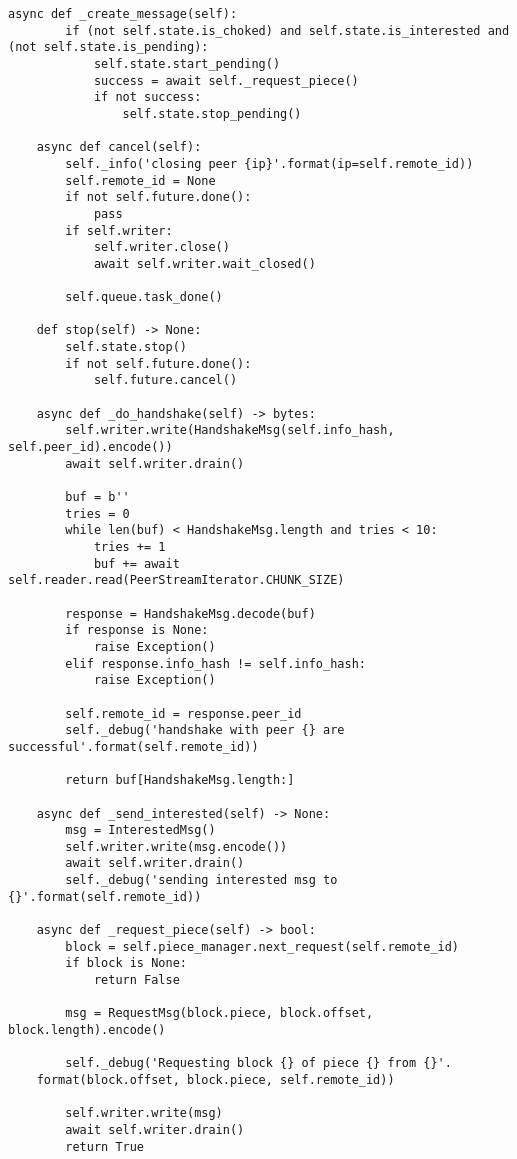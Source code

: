 \begin{lstlisting}[caption = {Класс TorrentClient}]
	async def _create_message(self):
		if (not self.state.is_choked) and self.state.is_interested and (not self.state.is_pending):
			self.state.start_pending()
			success = await self._request_piece()
			if not success:
				self.state.stop_pending()
	
	async def cancel(self):
		self._info('closing peer {ip}'.format(ip=self.remote_id))
		self.remote_id = None
		if not self.future.done():
			pass 
		if self.writer:
			self.writer.close()
			await self.writer.wait_closed()
		
		self.queue.task_done()
	
	def stop(self) -> None:
		self.state.stop()
		if not self.future.done():
			self.future.cancel()
	
	async def _do_handshake(self) -> bytes:
		self.writer.write(HandshakeMsg(self.info_hash, self.peer_id).encode())
		await self.writer.drain()
		
		buf = b''
		tries = 0
		while len(buf) < HandshakeMsg.length and tries < 10:
			tries += 1
			buf += await self.reader.read(PeerStreamIterator.CHUNK_SIZE)
		
		response = HandshakeMsg.decode(buf)
		if response is None:
			raise Exception()
		elif response.info_hash != self.info_hash:
			raise Exception()
		
		self.remote_id = response.peer_id
		self._debug('handshake with peer {} are successful'.format(self.remote_id))
		
		return buf[HandshakeMsg.length:]
	
	async def _send_interested(self) -> None:
		msg = InterestedMsg()
		self.writer.write(msg.encode())
		await self.writer.drain()
		self._debug('sending interested msg to {}'.format(self.remote_id))
	
	async def _request_piece(self) -> bool:
		block = self.piece_manager.next_request(self.remote_id)
		if block is None:
			return False
	
		msg = RequestMsg(block.piece, block.offset, block.length).encode()
		
		self._debug('Requesting block {} of piece {} from {}'.
	format(block.offset, block.piece, self.remote_id))
	
		self.writer.write(msg)
		await self.writer.drain()
		return True
	
\end{lstlisting}